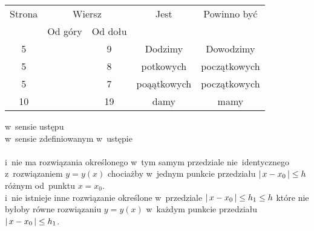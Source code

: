 \documentclass[a4paper,11pt]{article}
\begin{document}
\begin{center}

  \begin{tabular}{|c|c|c|c|c|}
    \hline
    Strona & \multicolumn{2}{c|}{Wiersz} & Jest
                              & Powinno być \\ \cline{2-3}
    & Od góry & Od dołu & & \\
    \hline
    5   & &  9 & Dodzimy & Dowodzimy \\
    5   & &  8 & potkowych & początkowych \\
    5   & &  7 & poąątkowych & początkowych \\
    10  & & 19 & damy & mamy \\
    \hline
  \end{tabular}

\end{center}

\vspace{\VerSpaceSix}


\noindent
{}
\Jest  w~sensie ustępu \\
\Powin w~sensie zdefiniowanym w~ustępie \\
 \\
\Jest  i~nie ma rozwiązania określonego w~tym samym przedziale
nie~identycznego z~rozwiązaniem $y = y( x )$ chociażby w~jednym
punkcie przedziału $|\, {  x - x_{ 0 }  } \,| \leq h$ różnym
od~punktu $x = x_{ 0 }$. \\
\Powin i~nie istnieje inne rozwiązanie określone w~przedziale
$|\, {  x - x_{ 0 }  } \,| \leq h_{ 1 } \leq h$ które nie byłoby równe
rozwiązaniu $y = y( x )$ w~każdym punkcie przedziału
$|\, {  x - x_{ 0 }  } \,| \leq h_{ 1 }$. \\












\newpage

\end{document}
